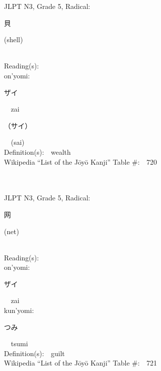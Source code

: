 \begin{multicols}{2}
{JLPT N3, Grade 5, Radical:\ \ {\begin{CJK}{UTF8}{min} 貝 \end{CJK}} (shell) } \\
Reading(s):\ \ \\
{\hspace*{1em}}on'yomi:\ \ \\
{\hspace*{2em}}{\begin{CJK}{UTF8}{min} ザイ \end{CJK}}\ \ zai\ \ \\
{\hspace*{2em}}{\begin{CJK}{UTF8}{min} （サイ） \end{CJK}}\ \ (sai)\ \ \\
Definition(s):\ \ wealth \\
Wikipedia ``List of the J\=oy\=o Kanji'' Table \#:\ \ 720 \\
\ \ \\
{\fontsize{34pt}{40pt}  }\ \ \\  %
{JLPT N3, Grade 5, Radical:\ \ {\begin{CJK}{UTF8}{min} 网 \end{CJK}} (net) } \\
Reading(s):\ \ \\
{\hspace*{1em}}on'yomi:\ \ \\
{\hspace*{2em}}{\begin{CJK}{UTF8}{min} ザイ \end{CJK}}\ \ zai\ \ \\
{\hspace*{1em}}kun'yomi:\ \ \\
{\hspace*{2em}}{\begin{CJK}{UTF8}{min} つみ \end{CJK}}\ \ tsumi\ \ \\
Definition(s):\ \ guilt \\
Wikipedia ``List of the J\=oy\=o Kanji'' Table \#:\ \ 721 \\
\ \ \\
{\fontsize{34pt}{40pt}  }\ \ \\  %

\end{multicols}
